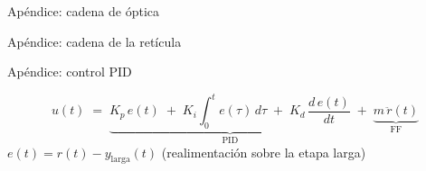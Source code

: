 \documentclass[en,16:9,navbarinline,bigfoot]{sdqbeamer}
\begin{document}
\begin{frame}[fragile]{Apéndice: cadena de óptica}
    \begin{center}
        \opticsChainFigure
    \end{center}
\end{frame}

\begin{frame}[fragile]{Apéndice: cadena de la retícula}
    \begin{center}
        \reticleChainFigure
    \end{center}
\end{frame}

\begin{frame}{Apéndice: control PID}
    \vspace{0.10cm}
    \begin{center}
    \begin{equation*}
        u(t) \;=\; \underbrace{K_p\, e(t) \;+\; K_i \!\int_0^{t}\! e(\tau)\,d\tau \;+\; K_d\,\frac{d\,e(t)}{dt}}_{\text{PID}} \;+\; \underbrace{m\,\ddot r(t)}_{\text{FF}}
    \end{equation*}
    {\footnotesize $e(t) = r(t) - y_{\text{larga}}(t)$ \;\; (realimentación sobre la etapa larga)}
    \end{center}


\end{frame}
\end{document}
